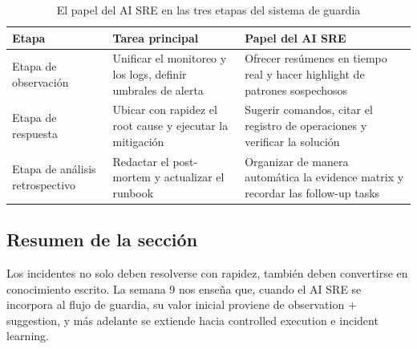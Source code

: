 \begin{table}[H]
\centering
\begin{tabular}{p{} p{} p{}}
\toprule
Etapa & Tarea principal & Papel del AI SRE \\
\midrule
Etapa de observación & Unificar el monitoreo y los logs, definir umbrales de alerta & Ofrecer resúmenes en tiempo real y hacer highlight de patrones sospechosos \\
Etapa de respuesta & Ubicar con rapidez el root cause y ejecutar la mitigación & Sugerir comandos, citar el registro de operaciones y verificar la solución \\
Etapa de análisis retrospectivo & Redactar el post-mortem y actualizar el runbook & Organizar de manera automática la evidence matrix y recordar las follow-up tasks \\
\bottomrule
\end{tabular}
\caption{El papel del AI SRE en las tres etapas del sistema de guardia}
\end{table}

\subsection{Resumen de la sección}

Los incidentes no solo deben resolverse con rapidez, también deben convertirse en conocimiento escrito. La semana 9 nos enseña que, cuando el AI SRE se incorpora al flujo de guardia, su valor inicial proviene de observation + suggestion, y más adelante se extiende hacia controlled execution e incident learning.

